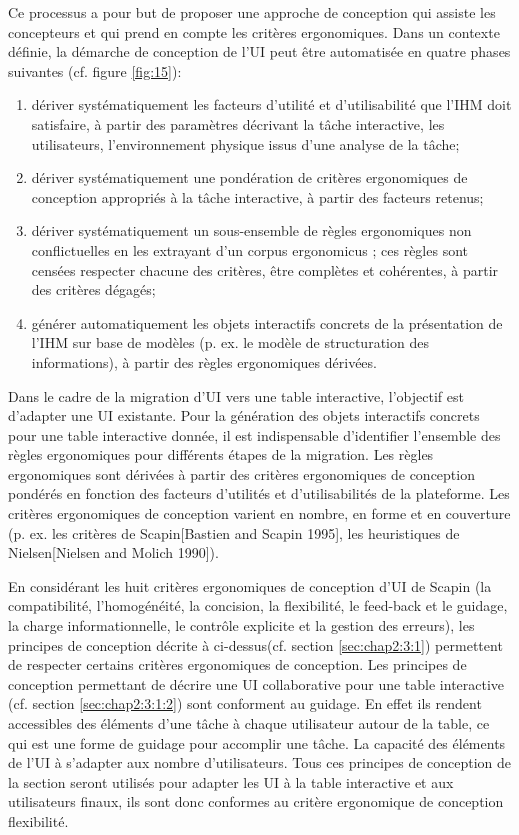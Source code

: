 Ce processus a pour but de proposer une approche de conception qui assiste les concepteurs et qui prend en compte les critères ergonomiques. Dans un contexte définie, la démarche de conception de l'UI peut être automatisée en quatre phases suivantes (cf. figure \ref{fig:15}):
\begin{enumerate}
\item dériver systématiquement les facteurs d'utilité et d'utilisabilité que l'IHM doit satisfaire, à partir des paramètres décrivant la tâche interactive, les utilisateurs, l'environnement physique issus d'une analyse de la tâche;
\item dériver systématiquement une pondération de critères ergonomiques de conception
appropriés à la tâche interactive, à partir des facteurs retenus;
\item dériver systématiquement un sous-ensemble de règles ergonomiques non
conflictuelles en les extrayant d'un corpus ergonomicus ; ces règles sont censées respecter chacune des critères, être complètes et cohérentes, à partir des critères dégagés;
\item générer automatiquement les objets interactifs concrets de la présentation
de l'IHM sur base de modèles (p. ex. le modèle de structuration des informations), à partir des règles ergonomiques dérivées.
\end{enumerate}
Dans le cadre de la migration d'UI vers une table interactive, l'objectif est d'adapter une UI existante. Pour la génération des objets interactifs concrets pour une table interactive donnée, il est indispensable d'identifier l'ensemble des règles ergonomiques pour différents étapes de la migration. Les règles ergonomiques sont dérivées à partir des critères ergonomiques de conception pondérés en fonction des facteurs d'utilités et d'utilisabilités de la plateforme.  Les critères ergonomiques de conception varient en nombre, en forme et en couverture (p. ex. les critères de Scapin[Bastien and Scapin 1995], les heuristiques de Nielsen[Nielsen and Molich 1990]).

En considérant les huit critères ergonomiques de conception d'UI de Scapin (la compatibilité, l'homogénéité, la concision, la flexibilité, le feed-back et le guidage, la charge informationnelle, le contrôle explicite et la gestion des erreurs), les principes de conception décrite à ci-dessus(cf. section \ref{sec:chap2:3:1}) permettent de respecter certains critères ergonomiques de conception. Les principes de conception permettant de décrire une UI collaborative pour une table interactive (cf. section \ref{sec:chap2:3:1:2}) sont conforment au guidage. En effet ils rendent accessibles des éléments d'une tâche à chaque utilisateur autour de la table, ce qui est une forme de guidage pour accomplir une tâche. La capacité des éléments de l'UI à s'adapter aux nombre d'utilisateurs. Tous ces principes de conception de la section seront utilisés pour adapter les UI à la table interactive et aux utilisateurs finaux, ils sont donc conformes au critère ergonomique de conception flexibilité.


